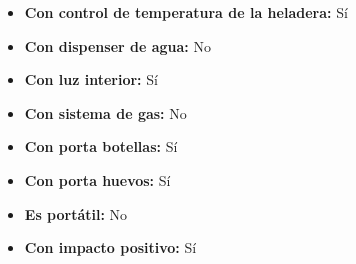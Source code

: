 \documentclass{article}
\begin{document}
\begin{adjustwidth}{2em}{}
\begin{itemize}
\begin{itemize}
    \item \textbf {Con control de temperatura de la heladera:} Sí
    \item \textbf {Con dispenser de agua:} No
    \item \textbf {Con luz interior:} Sí
    \item \textbf {Con sistema de gas:} No
    \item \textbf {Con porta botellas:} Sí
    \item \textbf {Con porta huevos:} Sí
    \item \textbf {Es portátil:} No
    \item \textbf {Con impacto positivo:} Sí
    \end{itemize}
\end{itemize}

\vspace{1\baselineskip} %
\end{adjustwidth}
\end{document}
